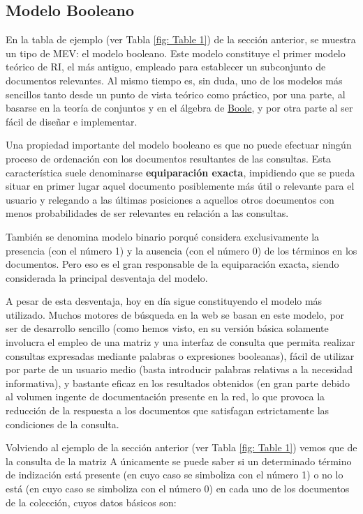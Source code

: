 \documentclass[titlepage]{article}
\begin{document}
	\subsection{Modelo Booleano}
	
	En la tabla de ejemplo (ver Tabla \ref{fig: Table 1}) de la sección anterior, se muestra un tipo de MEV: el modelo booleano. Este modelo constituye el primer modelo teórico de RI, el más antiguo, empleado para establecer un subconjunto de documentos relevantes. Al mismo tiempo es, sin duda, uno de los modelos más sencillos tanto desde un punto de vista teórico como práctico, por una parte, al basarse en la teoría de conjuntos y en el álgebra de \href{https://es.wikipedia.org/wiki/\%C3\%81lgebra_de_Boole}{Boole}, y por otra parte al ser fácil de diseñar e implementar.
	
	\newpage
	
	Una propiedad importante del modelo booleano es que no puede efectuar ningún proceso de ordenación con los documentos resultantes de las consultas. Esta característica suele denominarse \textbf{equiparación exacta}, impidiendo que se pueda situar en primer lugar aquel documento posiblemente más útil o relevante para el usuario y relegando a las últimas posiciones a aquellos otros documentos con menos probabilidades de ser relevantes en relación a las consultas.
	
	También se denomina modelo binario porqué considera exclusivamente la presencia (con el número 1) y la ausencia (con el número 0) de los términos en los documentos. Pero eso es el gran responsable de la equiparación exacta, siendo considerada la principal desventaja del modelo. 
	
	A pesar de esta desventaja, hoy en día sigue constituyendo el modelo más utilizado. Muchos motores de búsqueda en la web se basan en este modelo, por ser de desarrollo sencillo (como hemos visto, en su versión básica solamente involucra el empleo de una matriz y una interfaz de consulta que permita realizar consultas expresadas mediante palabras o expresiones booleanas), fácil de utilizar por parte de un usuario medio (basta introducir palabras relativas a la necesidad informativa), y bastante eficaz en los resultados obtenidos (en gran parte debido al volumen ingente de documentación presente en la red, lo que provoca la reducción de la respuesta a los documentos que satisfagan estrictamente las condiciones de la consulta.
	
	Volviendo al ejemplo de la sección anterior (ver Tabla \ref{fig: Table 1}) vemos que de la consulta de la matriz A únicamente se puede saber si un determinado término de indización está presente (en cuyo caso se simboliza con el número 1) o no lo está (en cuyo caso se simboliza con el número 0) en cada uno de los documentos de la colección, cuyos datos básicos son:
	
\end{document}
